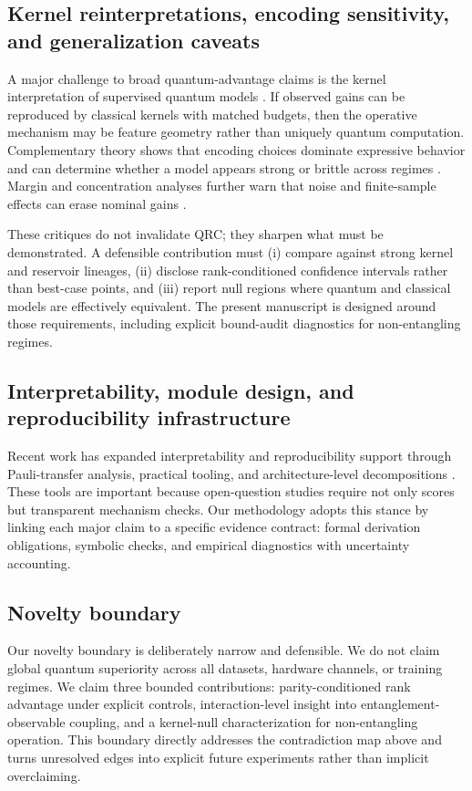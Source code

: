 \documentclass{article} %
\begin{document}
\subsection{Kernel reinterpretations, encoding sensitivity, and generalization caveats}
A major challenge to broad quantum-advantage claims is the kernel interpretation of supervised quantum models \citep{S006}. If observed gains can be reproduced by classical kernels with matched budgets, then the operative mechanism may be feature geometry rather than uniquely quantum computation. Complementary theory shows that encoding choices dominate expressive behavior and can determine whether a model appears strong or brittle across regimes \citep{S007,S030}. Margin and concentration analyses further warn that noise and finite-sample effects can erase nominal gains \citep{S020,S035}.

These critiques do not invalidate QRC; they sharpen what must be demonstrated. A defensible contribution must (i) compare against strong kernel and reservoir lineages, (ii) disclose rank-conditioned confidence intervals rather than best-case points, and (iii) report null regions where quantum and classical models are effectively equivalent. The present manuscript is designed around those requirements, including explicit bound-audit diagnostics for non-entangling regimes.

\subsection{Interpretability, module design, and reproducibility infrastructure}
Recent work has expanded interpretability and reproducibility support through Pauli-transfer analysis, practical tooling, and architecture-level decompositions \citep{S008,S011,S013,S016,S024,S037}. These tools are important because open-question studies require not only scores but transparent mechanism checks. Our methodology adopts this stance by linking each major claim to a specific evidence contract: formal derivation obligations, symbolic checks, and empirical diagnostics with uncertainty accounting.

\subsection{Novelty boundary}
Our novelty boundary is deliberately narrow and defensible. We do not claim global quantum superiority across all datasets, hardware channels, or training regimes. We claim three bounded contributions: parity-conditioned rank advantage under explicit controls, interaction-level insight into entanglement-observable coupling, and a kernel-null characterization for non-entangling operation. This boundary directly addresses the contradiction map above and turns unresolved edges into explicit future experiments rather than implicit overclaiming.
\end{document}
